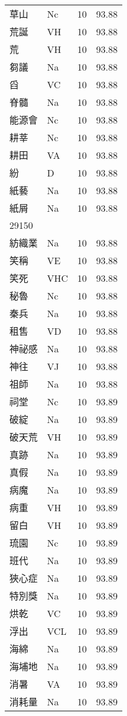 \documentclass[twocolumn]{book}
\begin{document}
\begin{supertabular}{llrr}
草山 & Nc & 10 &  93.88\\
荒誕 & VH & 10 &  93.88\\
荒 & VH & 10 &  93.88\\
芻議 & Na & 10 &  93.88\\
舀 & VC & 10 &  93.88\\
脊髓 & Na & 10 &  93.88\\
能源會 & Nc & 10 &  93.88\\
耕莘 & Nc & 10 &  93.88\\
耕田 & VA & 10 &  93.88\\
紛 & D & 10 &  93.88\\
紙藝 & Na & 10 &  93.88\\
紙屑 & Na & 10 &  93.88\\
29150\\
紡織業 & Na & 10 &  93.88\\
笑稱 & VE & 10 &  93.88\\
笑死 & VHC & 10 &  93.88\\
秘魯 & Nc & 10 &  93.88\\
秦兵 & Na & 10 &  93.88\\
租售 & VD & 10 &  93.88\\
神祕感 & Na & 10 &  93.88\\
神往 & VJ & 10 &  93.88\\
祖師 & Na & 10 &  93.88\\
祠堂 & Nc & 10 &  93.89\\
破綻 & Na & 10 &  93.89\\
破天荒 & VH & 10 &  93.89\\
真跡 & Na & 10 &  93.89\\
真假 & Na & 10 &  93.89\\
病魔 & Na & 10 &  93.89\\
病重 & VH & 10 &  93.89\\
留白 & VH & 10 &  93.89\\
琉園 & Nc & 10 &  93.89\\
班代 & Na & 10 &  93.89\\
狹心症 & Na & 10 &  93.89\\
特別獎 & Na & 10 &  93.89\\
烘乾 & VC & 10 &  93.89\\
浮出 & VCL & 10 &  93.89\\
海綿 & Na & 10 &  93.89\\
海埔地 & Na & 10 &  93.89\\
消暑 & VA & 10 &  93.89\\
消耗量 & Na & 10 &  93.89\\

\end{supertabular}
\end{document}
